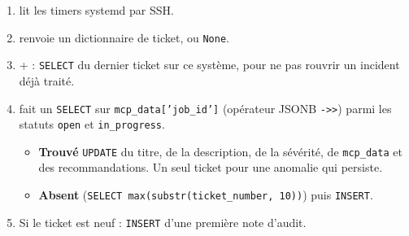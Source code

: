 \begin{enumerate}
  \item {} lit les timers systemd par SSH.
  \item {} renvoie un dictionnaire de ticket, ou
  \texttt{None}.
  \item {} +  : \texttt{SELECT} du
  dernier ticket sur ce système, pour ne pas rouvrir un incident déjà traité.
  \item {} \arrowto{} 
  fait un \texttt{SELECT} sur \texttt{mcp\_data['job\_id']} (opérateur JSONB
  \texttt{->>}) parmi les statuts \texttt{open} et \texttt{in\_progress}.
  \begin{itemize}
    \item \textbf{Trouvé} \arrowto{} \texttt{UPDATE} du titre, de la description,
    de la sévérité, de \texttt{mcp\_data} et des recommandations. Un seul ticket
    pour une anomalie qui persiste.
    \item \textbf{Absent} \arrowto{} 
    (\texttt{SELECT max(substr(ticket\_number, 10))}) puis \texttt{INSERT}.
  \end{itemize}
  \item Si le ticket est neuf : \texttt{INSERT} d'une première note d'audit.
\end{enumerate}

